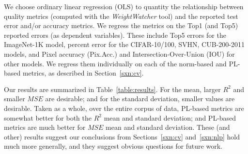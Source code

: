 We choose ordinary linear regression (OLS) to quantity the relationship between quality metrics (computed with the \emph{WeightWatcher} tool) 
and the reported test error and/or accuracy metrics.
We regress the metrics on the Top1 (and Top5) reported errors (as dependent variables).
These include Top5 errors for the ImageNet-1K model, percent error for the CIFAR-10/100, SVHN, CUB-200-2011 models, and Pixel accuracy
(Pix.Acc.) and Intersection-Over-Union (IOU) for other models.
We regress them individually on each of the norm-based and PL-based metrics, as described in Section~\ref{sxn:cv}.

Our results are summarized in Table~\ref{table:results}.
For the mean, larger $R^{2}$ and smaller $MSE$ are desirable; and for the standard deviation, smaller values are desirable.
Taken as a whole, over the entire corpus of data, PL-based metrics are somewhat better for both the $R^{2}$ mean and standard deviation;
and PL-based metrics are much better for $MSE$ mean and standard deviation.
These (and other) results suggest our conclusions from Sections~\ref{sxn:cv} and~\ref{sxn:nlp} hold much more generally, and they suggest
obvious questions for future work.

